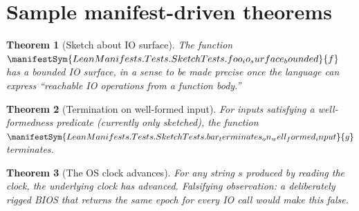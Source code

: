 \documentclass{article}
\newtheorem{theorem}{Theorem}
\begin{document}
\section*{Sample manifest-driven theorems}

\begin{theorem}[Sketch about IO surface]
The function $\manifestSym{LeanManifests.Tests.SketchTests.foo_io_surface_bounded}{f}$
has a bounded IO surface, in a sense to be made precise once
the language can express ``reachable IO operations from a
function body.''
\end{theorem}

\begin{theorem}[Termination on well-formed input]
For inputs satisfying a well-formedness predicate (currently
only sketched), the function $\manifestSym{LeanManifests.Tests.SketchTests.bar_terminates_on_well_formed_input}{g}$
terminates.
\end{theorem}

\begin{theorem}[The OS clock advances]
For any string $s$ produced by reading the clock, the underlying
clock has advanced. Falsifying observation: a deliberately rigged
BIOS that returns the same epoch for every IO call would make
this false.
\end{theorem}
\end{document}
